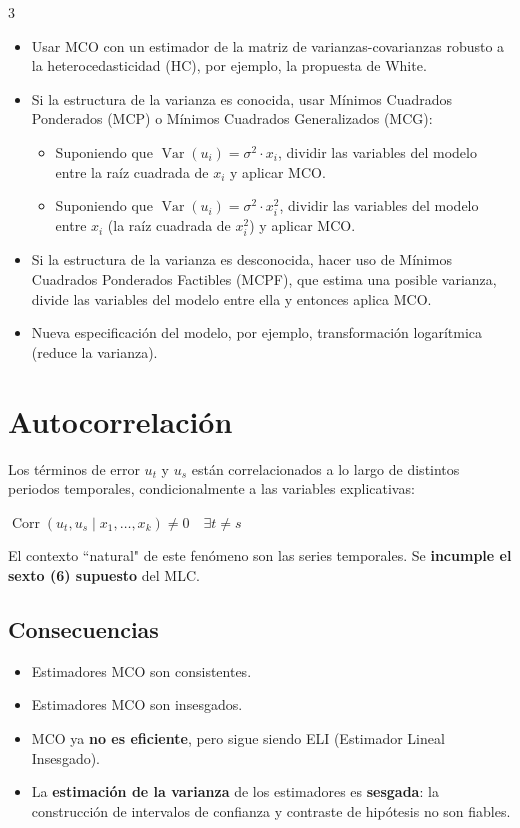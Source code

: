 \documentclass[10pt, a4paper, landscape]{article}
\DeclareMathOperator{\Var}{Var}
\DeclareMathOperator{\Corr}{Corr}
\begin{document}
\begin{multicols}{3}
\begin{itemize}[leftmargin=*]
	\item Usar MCO con un estimador de la matriz de varianzas-covarianzas robusto a la heterocedasticidad (HC), por ejemplo, la propuesta de White.
	\item Si la estructura de la varianza es conocida, usar Mínimos Cuadrados Ponderados (MCP) o Mínimos Cuadrados Generalizados (MCG):
	\begin{itemize}[leftmargin=*]
		\item Suponiendo que \( \Var(u_{i}) = \sigma^{2} \cdot x_{i} \), dividir las variables del modelo entre la raíz cuadrada de \( x_{i} \) y aplicar MCO.
		\item Suponiendo que \( \Var(u_{i}) = \sigma^{2} \cdot x_{i}^{2} \), dividir las variables del modelo entre \( x_{i} \) (la raíz cuadrada de \( x_{i}^{2} \)) y aplicar MCO.
	\end{itemize}
	\item Si la estructura de la varianza es desconocida, hacer uso de Mínimos Cuadrados Ponderados Factibles (MCPF), que estima una posible varianza, divide las variables del modelo entre ella y entonces aplica MCO.
	\item Nueva especificación del modelo, por ejemplo, transformación logarítmica (reduce la varianza).
\end{itemize}

\columnbreak

\section*{Autocorrelación}

Los términos de error \( u_{t} \) y \( u_{s} \) están correlacionados a lo largo de distintos periodos temporales, condicionalmente a las variables explicativas:

\begin{center}
	\( \Corr(u_{t}, u_{s} \mid x_{1}, \ldots, x_{k}) \neq 0 \quad \exists t \neq s \)
\end{center}

El contexto ``natural" de este fenómeno son las series temporales. Se \textbf{incumple el sexto (6) supuesto} del MLC.

\subsection*{Consecuencias}

\begin{itemize}[leftmargin=*]
	\item Estimadores MCO son consistentes.
	\item Estimadores MCO son insesgados.
	\item MCO ya \textbf{no es eficiente}, pero sigue siendo ELI (Estimador Lineal Insesgado).
	\item La \textbf{estimación de la varianza} de los estimadores es \textbf{sesgada}: la construcción de intervalos de confianza y contraste de hipótesis no son fiables.
\end{itemize}


\end{multicols}
\end{document}

